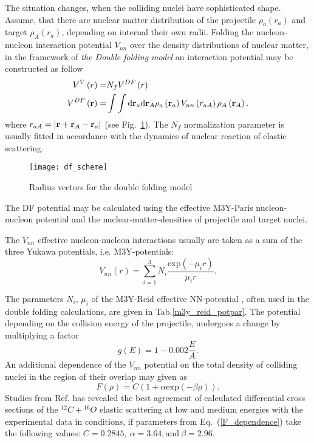 \documentclass[
12pt, %
oneside, %
english, %
onehalfspacing, %
onehalfspacing, %
headsepline, %
]{MastersDoctoralThesis} %
\begin{document}
The situation changes, when the colliding nuclei have sophisticated shape. Assume, that there are nuclear matter distribution of the projectile $\rho_a \left( { r}_a \right) $ and target $\rho_A \left( { r}_a \right)$, depending on internal their own radii. Folding the nucleon-nucleon interaction potential $V_{nn}$ over the density distributions of nuclear matter, in the framework of \textit{the Double folding model} an interaction potential may be constructed as follow 
\begin{align}
V^V\left( r \right) = & N_f V^{DF} \left( r \right) \nonumber \\ 
V^{DF} \left( {\bf r} \right) = & \int \int \text{d} {\bf r}_a\text{d} {\bf r}_A
\rho_a \left( {\bf r}_a \right) V_{nn} \left( r_{aA}\right)  \rho_A \left( {\bf r}_A \right). 
\label{df_potential}
\end{align}
where $r_{aA}=\vert {\bf r} + {\bf r}_A - {\bf r}_a \vert$ (see Fig.~\ref{fig:df_scheme}). The $N_f$ normalization parameter is usually fitted in accordance with the dynamics of nuclear reaction of elastic scattering.

\begin{figure}
\centering
\texttt{[image: df\_scheme]}
\decoRule
\caption{ \footnotesize Radius vectors for the double folding model}
\label{fig:df_scheme}
\end{figure}

The DF potential may be calculated using the effective M3Y-Paris \cite{anantaraman1983effective} nucleon-nucleon potential and the nuclear-matter-densities of projectile and target nuclei. 

 The $V_{nn}$ effective nucleon-nucleon interactions usually are taken as a sum of the three Yukawa potentials, i.e. M3Y-potentials:
 \begin{equation}
 V_{nn}(r)=\sum_{i=1}^{3} N_i \frac{\text{exp}(-\mu_i r)}{\mu_i r}.
 \end{equation}
 
 
The parameters  $N_i$, $\mu_i$ of the M3Y-Reid effective NN-potential \cite{bertsch1977interactions}, often used in the double folding calculations, are given in Tab.\ref{m3y_reid_potpar}.
The potential depending on the collision energy of the projectile, undergoes a change by multiplying a factor
\begin{equation}
g(E)= 1-0.002 \frac{E}{A} .
\end{equation}
An additional dependence of the $V_{nn}$ potential on the total density of colliding nuclei in the region of their overlap may given as
\begin{equation}
F(\rho)=C \left( 1+ \alpha \text{exp} \left( - \beta \rho \right) \right).
\label{F_dependence}
\end{equation}
  Studies from Ref. \cite{khoa1994double} has revealed the best agreement of calculated differential cross sections of the $ {}^{12}C+{}^{16}O$  elastic scattering at low and medium energies with the experimental data in conditions, if parameters from Eq.~(\ref{F_dependence}) take the following values: $C=0.2845,~\alpha=3.64, \text{and}~\beta=2.96$.
\end{document}
